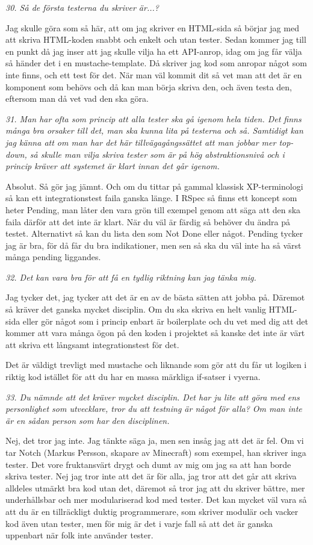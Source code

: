 \documentclass[11pt]{article}
\begin{document}
\emph{30. Så de första testerna du skriver är...?}

Jag skulle göra som så här, att om jag skriver en HTML-sida så börjar jag med att skriva HTML-koden snabbt och enkelt och utan tester. Sedan kommer jag till en punkt då jag inser att jag skulle vilja ha ett API-anrop, idag om jag får välja så händer det i en mustache-template. Då skriver jag kod som anropar något som inte finns, och ett test för det. När man väl kommit dit så vet man att det är en komponent som behövs och då kan man börja skriva den, och även testa den, eftersom man då vet vad den ska göra.

\emph{31. Man har ofta som princip att alla tester ska gå igenom hela tiden. Det finns många bra orsaker till det, man ska kunna lita på testerna och så. Samtidigt kan jag känna att om man har det här tillvägagångssättet att man jobbar mer top-down, så skulle man vilja skriva tester som är på hög abstraktionsnivå och i princip kräver att systemet är klart innan det går igenom.}

Absolut. Så gör jag jämnt. Och om du tittar på gammal klassisk XP-terminologi så kan ett integrationstest faila ganska länge. I RSpec så finns ett koncept som heter Pending, man låter den vara grön till exempel genom att säga att den ska faila därför att det inte är klart. När du väl är färdig så behöver du ändra på testet. Alternativt så kan du lista den som Not Done eller något. Pending tycker jag är bra, för då får du bra indikationer, men sen så ska du väl inte ha så värst många pending liggandes.

\emph{32. Det kan vara bra för att få en tydlig riktning kan jag tänka mig.}

Jag tycker det, jag tycker att det är en av de bästa sätten att jobba på. Däremot så kräver det ganska mycket disciplin. Om du ska skriva en helt vanlig HTML-sida eller gör något som i princip enbart är boilerplate och du vet med dig att det kommer att vara många ögon på den koden i projektet så kanske det inte är värt att skriva ett långsamt integrationstest för det.

Det är väldigt trevligt med mustache och liknande som gör att du får ut logiken i riktig kod istället för att du har en massa märkliga if-satser i vyerna.

\emph{33. Du nämnde att det kräver mycket disciplin. Det har ju lite att göra med ens personlighet som utvecklare, tror du att testning är något för alla? Om man inte är en sådan person som har den disciplinen.}

Nej, det tror jag inte. Jag tänkte säga ja, men sen insåg jag att det är fel. Om vi tar Notch (Markus Persson, skapare av Minecraft) som exempel, han skriver inga tester. Det vore fruktansvärt drygt och dumt av mig om jag sa att han borde skriva tester. Nej jag tror inte att det är för alla, jag tror att det går att skriva alldeles utmärkt bra kod utan det, däremot så tror jag att du skriver bättre, mer underhållsbar och mer modulariserad kod med tester. Det kan mycket väl vara så att du är en tillräckligt duktig programmerare, som skriver modulär och vacker kod även utan tester, men för mig är det i varje fall så att det är ganska uppenbart när folk inte använder tester.
\end{document}

